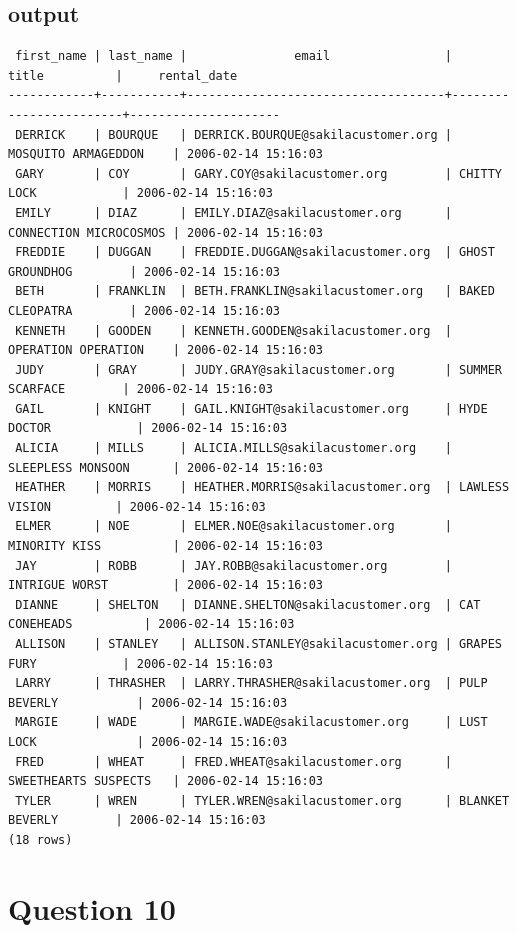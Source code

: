 \documentclass[11pt]{article}
\begin{document}
\subsection*{output}
{\scriptsize
\begin{verbatim}
 first_name | last_name |               email                |         title          |     rental_date
------------+-----------+------------------------------------+------------------------+---------------------
 DERRICK    | BOURQUE   | DERRICK.BOURQUE@sakilacustomer.org | MOSQUITO ARMAGEDDON    | 2006-02-14 15:16:03
 GARY       | COY       | GARY.COY@sakilacustomer.org        | CHITTY LOCK            | 2006-02-14 15:16:03
 EMILY      | DIAZ      | EMILY.DIAZ@sakilacustomer.org      | CONNECTION MICROCOSMOS | 2006-02-14 15:16:03
 FREDDIE    | DUGGAN    | FREDDIE.DUGGAN@sakilacustomer.org  | GHOST GROUNDHOG        | 2006-02-14 15:16:03
 BETH       | FRANKLIN  | BETH.FRANKLIN@sakilacustomer.org   | BAKED CLEOPATRA        | 2006-02-14 15:16:03
 KENNETH    | GOODEN    | KENNETH.GOODEN@sakilacustomer.org  | OPERATION OPERATION    | 2006-02-14 15:16:03
 JUDY       | GRAY      | JUDY.GRAY@sakilacustomer.org       | SUMMER SCARFACE        | 2006-02-14 15:16:03
 GAIL       | KNIGHT    | GAIL.KNIGHT@sakilacustomer.org     | HYDE DOCTOR            | 2006-02-14 15:16:03
 ALICIA     | MILLS     | ALICIA.MILLS@sakilacustomer.org    | SLEEPLESS MONSOON      | 2006-02-14 15:16:03
 HEATHER    | MORRIS    | HEATHER.MORRIS@sakilacustomer.org  | LAWLESS VISION         | 2006-02-14 15:16:03
 ELMER      | NOE       | ELMER.NOE@sakilacustomer.org       | MINORITY KISS          | 2006-02-14 15:16:03
 JAY        | ROBB      | JAY.ROBB@sakilacustomer.org        | INTRIGUE WORST         | 2006-02-14 15:16:03
 DIANNE     | SHELTON   | DIANNE.SHELTON@sakilacustomer.org  | CAT CONEHEADS          | 2006-02-14 15:16:03
 ALLISON    | STANLEY   | ALLISON.STANLEY@sakilacustomer.org | GRAPES FURY            | 2006-02-14 15:16:03
 LARRY      | THRASHER  | LARRY.THRASHER@sakilacustomer.org  | PULP BEVERLY           | 2006-02-14 15:16:03
 MARGIE     | WADE      | MARGIE.WADE@sakilacustomer.org     | LUST LOCK              | 2006-02-14 15:16:03
 FRED       | WHEAT     | FRED.WHEAT@sakilacustomer.org      | SWEETHEARTS SUSPECTS   | 2006-02-14 15:16:03
 TYLER      | WREN      | TYLER.WREN@sakilacustomer.org      | BLANKET BEVERLY        | 2006-02-14 15:16:03
(18 rows)
\end{verbatim}
}

\section*{Question 10}
\end{document}
